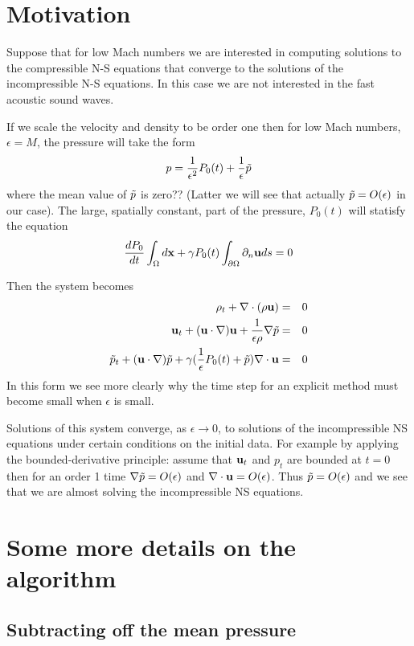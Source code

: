 \documentclass{article}
\begin{document}
\section{Motivation}

Suppose that for low Mach numbers we are interested in computing solutions to
the compressible N-S equations that converge to the solutions of the incompressible
N-S equations. In this case we are not interested in the fast acoustic sound waves.

If we scale the velocity and density to be order one then
for low Mach numbers, $\epsilon=M$, the pressure will take the form
\[
    p = {1\over \epsilon^2} P_0(t) + {1\over\epsilon} \tilde{p}
\]
where the mean value of $\tilde{p}$ is zero??
(Latter we will see that actually $\tilde{p}=O(\epsilon)$ in our case).
The large, spatially constant, part of the pressure, $P_0(t)$ will statisfy the equation
\[
  {d P_0 \over dt} \int_{\Omega} d{\bf x} + \gamma P_0(t) \int_{\partial \Omega} \partial_n {\bf u} ds = 0
\]

Then the system becomes
\begin{eqnarray*}
   \rho_t + \nabla\cdot(\rho {\bf u}) &=& 0 \\
   {\bf u}_t + ({\bf u}\cdot\nabla){\bf u} + {1\over\epsilon\rho}\nabla \tilde{p} &=& 0 \\
   \tilde{p}_t + ({\bf u}\cdot\nabla) \tilde{p} + \gamma ({1\over \epsilon} P_0(t) + \tilde{p}) \nabla\cdot{\bf u} &=& 0 
\end{eqnarray*}
In this form we see more clearly why the time step for an explicit method must become small when
$\epsilon$ is small.

Solutions of this system converge, as $\epsilon\rightarrow 0$, 
 to solutions of the incompressible NS equations under certain conditions on the initial data.
For example by applying the bounded-derivative principle: assume that ${\bf u}_t$ and $p_t$ are
bounded at $t=0$ then for an order 1 time
$\nabla\tilde{p}=O(\epsilon)$ and $\nabla\cdot{\bf u}=O(\epsilon)$. Thus $\tilde{p}=O(\epsilon)$ and we see
that we are almost solving the incompressible NS equations.


\section{Some more details on the algorithm}

\subsection{Subtracting off the mean pressure}
\end{document}
